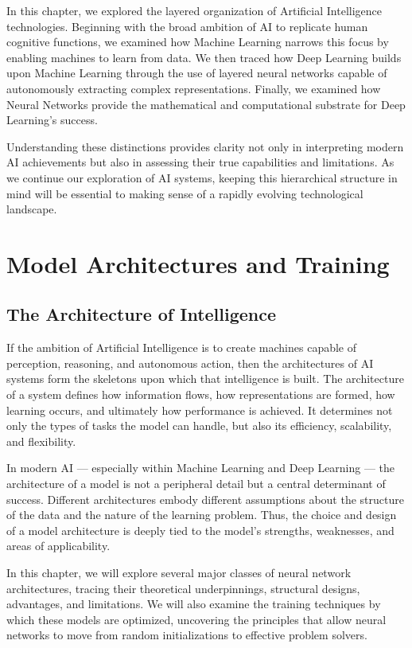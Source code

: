 \documentclass[openany]{book}
\begin{document}
In this chapter, we explored the layered organization of Artificial Intelligence
technologies. Beginning with the broad ambition of AI to replicate human 
cognitive functions, we examined how Machine Learning narrows this focus by 
enabling machines to learn from data. We then traced how Deep Learning builds 
upon Machine Learning through the use of layered neural networks capable of 
autonomously extracting complex representations. Finally, we examined how 
Neural Networks provide the mathematical and computational substrate for Deep 
Learning's success.

Understanding these distinctions provides clarity not only in interpreting 
modern AI achievements but also in assessing their true capabilities and 
limitations. As we continue our exploration of AI systems, keeping this 
hierarchical structure in mind will be essential to making sense of a 
rapidly evolving technological landscape.

\chapter{Model Architectures and Training}

\section{The Architecture of Intelligence}

If the ambition of Artificial Intelligence is to create machines capable of 
perception, reasoning, and autonomous action, then the architectures of AI 
systems form the skeletons upon which that intelligence is built. The 
architecture of a system defines how information flows, how representations are 
formed, how learning occurs, and ultimately how performance is achieved. It 
determines not only the types of tasks the model can handle, but also its 
efficiency, scalability, and flexibility.

In modern AI — especially within Machine Learning and Deep Learning — the 
architecture of a model is not a peripheral detail but a central determinant of 
success. Different architectures embody different assumptions about the 
structure of the data and the nature of the learning problem. Thus, the choice 
and design of a model architecture is deeply tied to the model's strengths, 
weaknesses, and areas of applicability.

In this chapter, we will explore several major classes of neural network 
architectures, tracing their theoretical underpinnings, structural designs, 
advantages, and limitations. We will also examine the training techniques by 
which these models are optimized, uncovering the principles that allow neural 
networks to move from random initializations to effective problem solvers.
\end{document}

